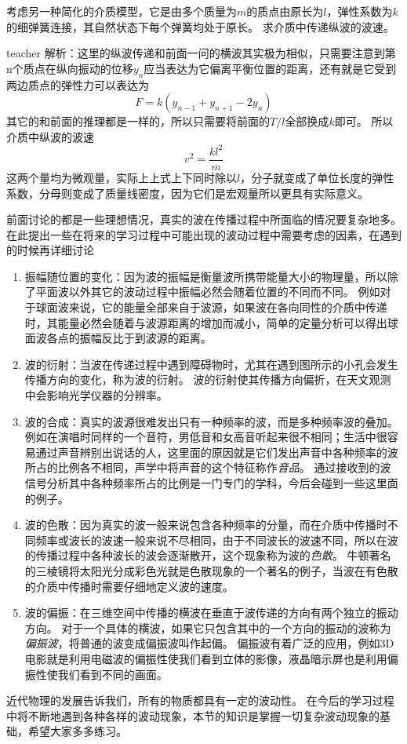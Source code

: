 \begin{example}
考虑另一种简化的介质模型，它是由多个质量为$m$的质点由原长为$l$，弹性系数为$k$的细弹簧连接，其自然状态下每个弹簧均处于原长。
求介质中传递纵波的波速。
\begin{taggedblock}{teacher}
\newline
解析：这里的纵波传递和前面一问的横波其实极为相似，只需要注意到第n个质点在纵向振动的位移$y_n$应当表达为它偏离平衡位置的距离，还有就是它受到两边质点的弹性力可以表达为
\[F = k(y_{n-1}+y_{n+1}-2y_n)\]
其它的和前面的推理都是一样的，所以只需要将前面的$T/l$全部换成$k$即可。
所以介质中纵波的波速
\[
v^2 = \frac{kl^2}{m}
\]
这两个量均为微观量，实际上上式上下同时除以$l$，分子就变成了单位长度的弹性系数，分母则变成了质量线密度，因为它们是宏观量所以更具有实际意义。
\end{taggedblock}
\end{example}

前面讨论的都是一些理想情况，真实的波在传播过程中所面临的情况要复杂地多。
在此提出一些在将来的学习过程中可能出现的波动过程中需要考虑的因素，在遇到的时候再详细讨论
\begin{enumerate}
\item 振幅随位置的变化：因为波的振幅是衡量波所携带能量大小的物理量，所以除了平面波以外其它的波动过程中振幅必然会随着位置的不同而不同。
例如对于球面波来说，它的能量全部来自于波源，如果波在各向同性的介质中传递时，其能量必然会随着与波源距离的增加而减小，简单的定量分析可以得出球面波各点的振幅反比于到波源的距离。

\item 波的衍射：当波在传递过程中遇到障碍物时，尤其在遇到图所示的小孔会发生传播方向的变化，称为波的衍射。
波的衍射使其传播方向偏折，在天文观测中会影响光学仪器的分辨率。


\item 波的合成：真实的波源很难发出只有一种频率的波，而是多种频率波的叠加。
例如在演唱时同样的一个音符，男低音和女高音听起来很不相同；生活中很容易通过声音辨别出说话的人，这里面的原因就是它们发出声音中各种频率的波所占的比例各不相同，声学中将声音的这个特征称作\emph{音品}。
通过接收到的波信号分析其中各种频率所占的比例是一门专门的学科，今后会碰到一些这里面的例子。

\item 波的色散：因为真实的波一般来说包含各种频率的分量，而在介质中传播时不同频率或波长的波速一般来说不尽相同，由于不同波长的波速不同，所以在波的传播过程中各种波长的波会逐渐散开，这个现象称为波的\emph{色散}。
牛顿著名的三棱镜将太阳光分成彩色光就是色散现象的一个著名的例子，当波在有色散的介质中传播时需要仔细地定义波的速度。


\item 波的偏振：在三维空间中传播的横波在垂直于波传递的方向有两个独立的振动方向。
对于一个具体的横波，如果它只包含其中的一个方向的振动的波称为\emph{偏振波}，将普通的波变成偏振波叫作起偏。
偏振波有着广泛的应用，例如3D电影就是利用电磁波的偏振性使我们看到立体的影像，液晶暗示屏也是利用偏振性使我们看到不同的画面。


\end{enumerate}

近代物理的发展告诉我们，所有的物质都具有一定的波动性。
在今后的学习过程中将不断地遇到各种各样的波动现象，本节的知识是掌握一切复杂波动现象的基础，希望大家多多练习。